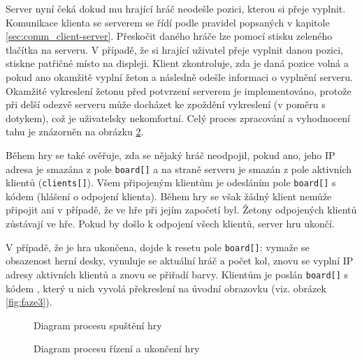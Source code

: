 Server nyní čeká dokud mu hrající hráč neodešle pozici, kterou si přeje vyplnit. Komunikace klienta se serverem se řídí podle pravidel popsaných v kapitole \ref{sec:comm_client-server}. Přeskočit daného hráče lze pomocí stisku zeleného tlačítka na serveru. V případě, že si hrající uživatel přeje vyplnit danou pozici, stiskne patřičné místo na displeji. Klient zkontroluje, zda je daná pozice volná a pokud ano okamžitě vyplní žeton a následně odešle informaci o vyplnění serveru. Okamžité vykreslení žetonu před potvrzení serverem je implementováno, protože při delší odezvě serveru může docházet ke zpoždění vykreslení (v poměru s dotykem), což je uživatelsky nekomfortní. Celý proces zpracování a vyhodnocení tahu je znázorněn na obrázku \ref{fig:flow:gameFlow}.

Během hry se také ověřuje, zda se nějaký hráč neodpojil, pokud ano, jeho IP adresa je smazána z pole \texttt{board[]} a na straně serveru je smazán z pole aktivních klientů (\texttt{clients[]}). Všem připojeným klientům je odesláním pole \texttt{board[]} s kódem  (hlášení o odpojení klienta). Během hry se však žádný klient nemůže připojit ani v případě, že ve hře při jejím započetí byl. Žetony odpojených klientů zůstávají ve hře. Pokud by došlo k odpojení všech klientů, server hru ukončí.

V případě, že je hra ukončena, dojde k resetu pole \texttt{board[]}: vymaže se obsazenost herní desky, vynuluje se aktuální hráč a počet kol, znovu se vyplní IP adresy aktivních klientů a znovu se přiřadí barvy. Klientům je poslán \texttt{board[]} s kódem , který u nich vyvolá překreslení na úvodní obrazovku (viz. obrázek \ref{fig:faze3}).

\begin{figure}
  \centering
  
  \caption{\label{fig:flow:gameBegin} Diagram procesu spuštění hry}
\end{figure}


\begin{figure}
  \centering
  
  \caption{\label{fig:flow:gameFlow} Diagram procesu řízení a ukončení hry}
\end{figure}


